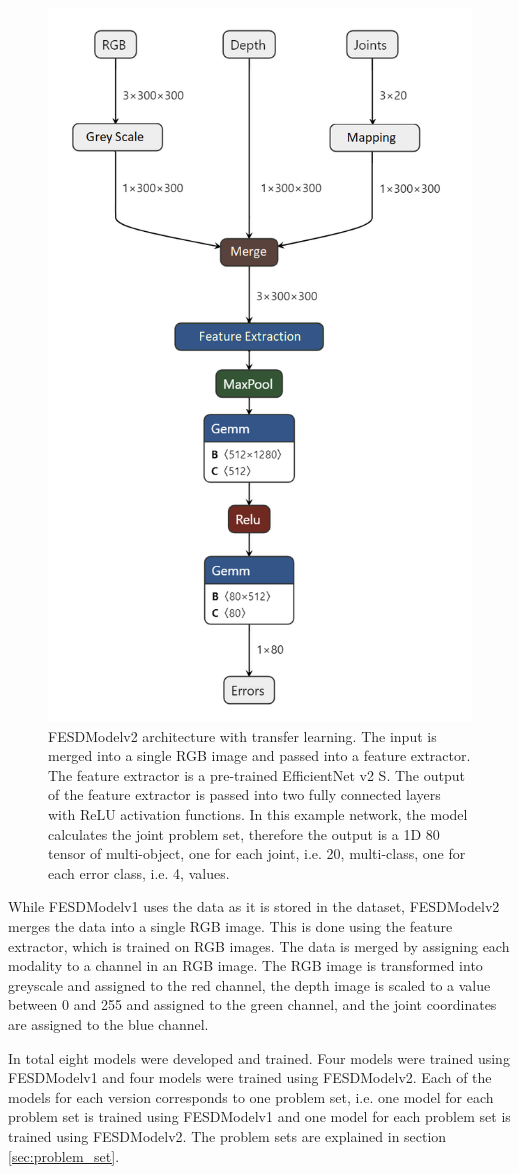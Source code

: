 \begin{figure}[ht]
  \centering
  \includegraphics[width=.6\linewidth]{figures/Model/FESDv2.png}
  \caption[FESDModel architecture version 2]{FESDModelv2 architecture with transfer learning. The input is merged into a single RGB image and passed into a feature extractor. The feature extractor is a pre-trained EfficientNet v2 S. The output of the feature extractor is passed into two fully connected layers with ReLU activation functions. In this example network, the model calculates the joint problem set, therefore the output is a 1D 80 tensor of multi-object, one for each joint, i.e. 20, multi-class, one for each error class, i.e. 4, values.}
  \label{fig:model_architecture_v2}
\end{figure}

While FESDModelv1 uses the data as it is stored in the dataset, FESDModelv2 merges the data into a single RGB image. This is done using the feature extractor, which is trained on RGB images. The data is merged by assigning each modality to a channel in an RGB image. The RGB image is transformed into greyscale and assigned to the red channel, the depth image is scaled to a value between 0 and 255 and assigned to the green channel, and the joint coordinates are assigned to the blue channel.

In total eight models were developed and trained. Four models were trained using FESDModelv1 and four models were trained using FESDModelv2. Each of the models for each version corresponds to one problem set, i.e. one model for each problem set is trained using FESDModelv1 and one model for each problem set is trained using FESDModelv2. The problem sets are explained in section \ref{sec:problem_set}.

